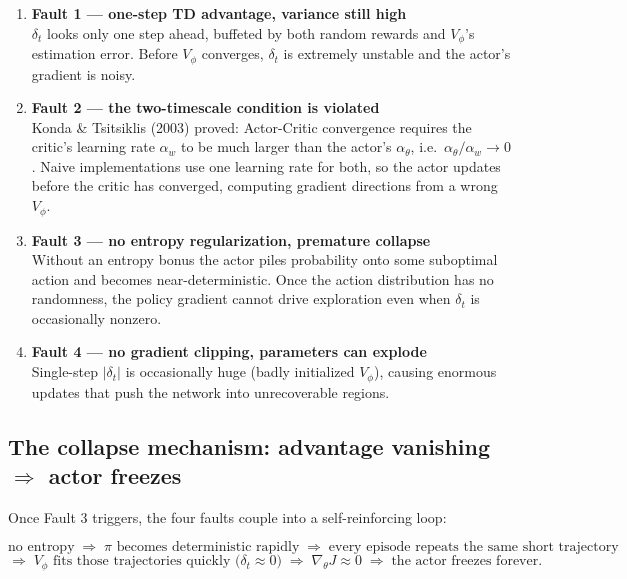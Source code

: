 \documentclass{article}
\begin{document}
\begin{enumerate}
  \item \textbf{Fault 1 --- one-step TD advantage, variance still high}\\
        $\delta_t$ looks only one step ahead, buffeted by both random rewards and $V_\phi$'s estimation error. Before $V_\phi$ converges, $\delta_t$ is extremely unstable and the actor's gradient is noisy.

  \item \textbf{Fault 2 --- the two-timescale condition is violated}\\
        Konda \& Tsitsiklis (2003) proved: Actor-Critic convergence requires the critic's learning rate $\alpha_w$ to be much larger than the actor's $\alpha_\theta$, i.e.\ $\alpha_\theta / \alpha_w \to 0$. Naive implementations use one learning rate for both, so the actor updates before the critic has converged, computing gradient directions from a wrong $V_\phi$.

  \item \textbf{Fault 3 --- no entropy regularization, premature collapse}\\
        Without an entropy bonus the actor piles probability onto some suboptimal action and becomes near-deterministic. Once the action distribution has no randomness, the policy gradient cannot drive exploration even when $\delta_t$ is occasionally nonzero.

  \item \textbf{Fault 4 --- no gradient clipping, parameters can explode}\\
        Single-step $|\delta_t|$ is occasionally huge (badly initialized $V_\phi$), causing enormous updates that push the network into unrecoverable regions.
\end{enumerate}

\subsection*{The collapse mechanism: advantage vanishing $\Rightarrow$ actor freezes}

Once Fault 3 triggers, the four faults couple into a self-reinforcing loop:

\[
\text{no entropy} \;\Rightarrow\; \pi \text{ becomes deterministic rapidly}
\;\Rightarrow\; \text{every episode repeats the same short trajectory}
\]
\[
\Rightarrow\; V_\phi \text{ fits those trajectories quickly (} \delta_t \approx 0 \text{)}
\;\Rightarrow\; \nabla_\theta J \approx 0 \;\Rightarrow\; \text{the actor freezes forever.}
\]
\end{document}
